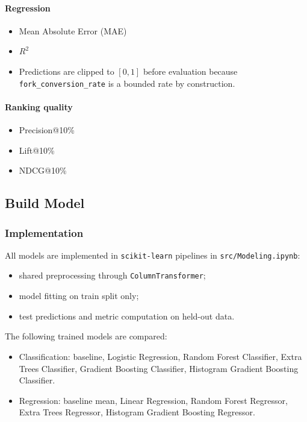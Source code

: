 \paragraph{Regression}
\begin{itemize}
    \item Mean Absolute Error (MAE)
    \item $R^2$
    \item Predictions are clipped to $[0, 1]$ before evaluation because \texttt{fork\_conversion\_rate} is a bounded rate by construction.
\end{itemize}

\paragraph{Ranking quality}
\begin{itemize}
    \item Precision@10\%
    \item Lift@10\%
    \item NDCG@10\%
\end{itemize}

\subsection{Build Model}

\subsubsection{Implementation}

All models are implemented in \texttt{scikit-learn} pipelines in \texttt{src/Modeling.ipynb}:
\begin{itemize}
    \item shared preprocessing through \texttt{ColumnTransformer};
    \item model fitting on train split only;
    \item test predictions and metric computation on held-out data.
\end{itemize}

The following trained models are compared:
\begin{itemize}
    \item Classification: baseline, Logistic Regression, Random Forest Classifier, Extra Trees Classifier, Gradient Boosting Classifier, Histogram Gradient Boosting Classifier.
    \item Regression: baseline mean, Linear Regression, Random Forest Regressor, Extra Trees Regressor, Histogram Gradient Boosting Regressor.
\end{itemize}

